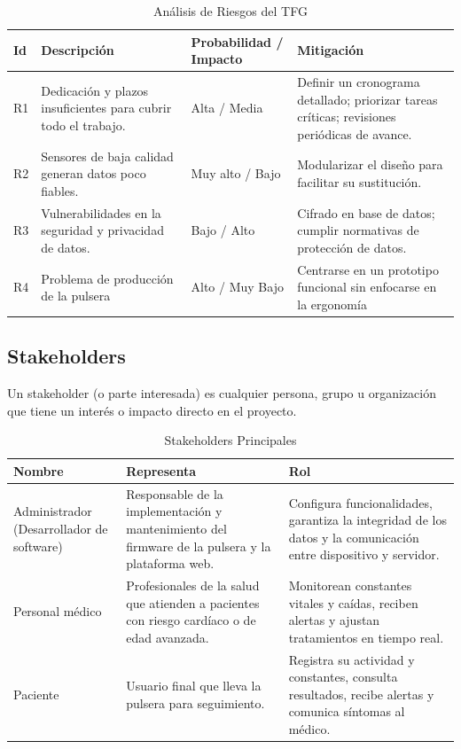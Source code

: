 \documentclass[12pt, a4paper]{article}
\begin{document}
		\begin{table}[ht]
			\centering
			\caption{Análisis de Riesgos del TFG}
			\begin{tabular}{|p{1cm}|p{5cm}|p{3cm}|p{6cm}|}
				\hline
				\textbf{Id} & \textbf{Descripción} & \textbf{Probabilidad / Impacto} & \textbf{Mitigación} \\
				\hline
				R1 & Dedicación y plazos insuficientes para cubrir todo el trabajo. & Alta / Media & Definir un cronograma detallado; priorizar tareas críticas; revisiones periódicas de avance. \\
				\hline
				R2 & Sensores de baja calidad generan datos poco fiables. & Muy alto / Bajo & Modularizar el diseño para facilitar su sustitución. \\
				\hline
				R3 & Vulnerabilidades en la seguridad y privacidad de datos. & Bajo / Alto &  Cifrado en base de datos; cumplir normativas de protección de datos. \\
				\hline
				R4 & Problema de producción de la pulsera & Alto / Muy Bajo & Centrarse en un prototipo funcional sin enfocarse en la ergonomía \\
				\hline
			\end{tabular}
		\end{table}
	
		\subsection{Stakeholders}
		
		Un stakeholder (o parte interesada) es cualquier persona, grupo u organización que tiene un interés o impacto directo en el proyecto.
		
		\begin{table}[ht]
			\centering
			\caption{Stakeholders Principales}
			\begin{tabular}{|p{3cm}|p{6cm}|p{7cm}|}
				\hline
				\textbf{Nombre} & \textbf{Representa} & \textbf{Rol} \\ 
				\hline
				Administrador (Desarrollador de software) &
				Responsable de la implementación y mantenimiento del firmware de la pulsera y la plataforma web. &
				Configura funcionalidades, garantiza la integridad de los datos y la comunicación entre dispositivo y servidor. \\
				\hline
				Personal médico &
				Profesionales de la salud que atienden a pacientes con riesgo cardíaco o de edad avanzada. &
				Monitorean constantes vitales y caídas, reciben alertas y ajustan tratamientos en tiempo real. \\
				\hline
				Paciente &
				Usuario final que lleva la pulsera para seguimiento. &
				Registra su actividad y constantes, consulta resultados, recibe alertas y comunica síntomas al médico. \\
				\hline
			\end{tabular}
		\end{table}
	
\end{document}
